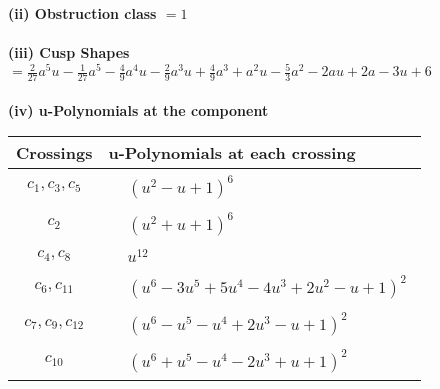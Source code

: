 \documentclass[1p]{elsarticle_modified}
\theoremstyle{definition}
\begin{document}
\flushleft \textbf{(ii) Obstruction class $= 1$}\\~\\
\flushleft \textbf{(iii) Cusp Shapes $= \frac{2}{27} a^5 u-\frac{1}{27} a^5-\frac{4}{9} a^4 u-\frac{2}{9} a^3 u+\frac{4}{9} a^3+a^2 u-\frac{5}{3} a^2-2 a u+2 a-3 u+6$}\\~\\
\newpage\renewcommand{\arraystretch}{1}
\flushleft \textbf{(iv) u-Polynomials at the component}\newline \\
\begin{tabular}{m{50pt}|m{274pt}}
Crossings & \hspace{64pt}u-Polynomials at each crossing \\
\hline $$\begin{aligned}c_{1},c_{3},c_{5}\end{aligned}$$&$\begin{aligned}
&(u^2- u+1)^6
\end{aligned}$\\
\hline $$\begin{aligned}c_{2}\end{aligned}$$&$\begin{aligned}
&(u^2+u+1)^6
\end{aligned}$\\
\hline $$\begin{aligned}c_{4},c_{8}\end{aligned}$$&$\begin{aligned}
&u^{12}
\end{aligned}$\\
\hline $$\begin{aligned}c_{6},c_{11}\end{aligned}$$&$\begin{aligned}
&(u^6-3 u^5+5 u^4-4 u^3+2 u^2- u+1)^2
\end{aligned}$\\
\hline $$\begin{aligned}c_{7},c_{9},c_{12}\end{aligned}$$&$\begin{aligned}
&(u^6- u^5- u^4+2 u^3- u+1)^2
\end{aligned}$\\
\hline $$\begin{aligned}c_{10}\end{aligned}$$&$\begin{aligned}
&(u^6+u^5- u^4-2 u^3+u+1)^2
\end{aligned}$\\
\hline
\end{tabular}\\~\\
\end{document}
